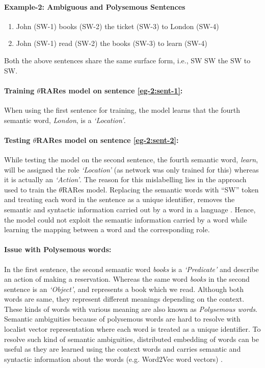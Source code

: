 \paragraph{Example-2: Ambiguous and Polysemous Sentences}

\begin{enumerate}[noitemsep]
\item John (SW-1) books (SW-2) the ticket (SW-3) to London (SW-4) \label{eg-2:sent-1}
\item John (SW-1) read (SW-2) the books (SW-3) to learn (SW-4) \label{eg-2:sent-2}
\end{enumerate}

Both the above sentences share the same surface form, i.e., SW SW the SW to SW.

\paragraph{Training $\theta$RARes model on sentence \ref{eg-2:sent-1}:} When using the first sentence for training, the model learns that the fourth semantic word, \textit{London}, is a \textit{`Location'}.

\paragraph{Testing $\theta$RARes model on sentence \ref{eg-2:sent-2}:} While testing the model on the second sentence, the fourth semantic word, \textit{learn}, will be assigned the role \textit{`Location'} (as network was only trained for this) whereas it is actually an \textit{`Action'}. The reason for this mislabelling lies in the approach used to train the $\theta$RARes model. Replacing the semantic words with ``SW'' token and treating each word in the sentence as a unique identifier, removes the semantic and syntactic information carried out by a word in a language \cite{w2v:tensor_flow}. Hence, the model could not exploit the semantic information carried by a word while learning the mapping between a word and the corresponding role.

\paragraph{Issue with Polysemous words:} In the first sentence, the second semantic word \textit{books} is a \textit{`Predicate'} and describe an action of making a reservation. Whereas the same word \textit{books} in the second sentence is an \textit{`Object'}, and represents a book which we read. Although both words are same, they represent different meanings depending on the context. These kinds of words with various meaning are also known as \textit{Polysemous words}. Semantic ambiguities because of polysemous words are hard to resolve with localist vector representation where each word is treated as a unique identifier. To resolve such kind of semantic ambiguities, distributed embedding of words can be useful as they are learned using the context words and carries semantic and syntactic information about the words (e.g. Word2Vec word vectors) \cite{w2v:mikolov_2013_distributed, w2v:mikolov_2013_efficient}.

